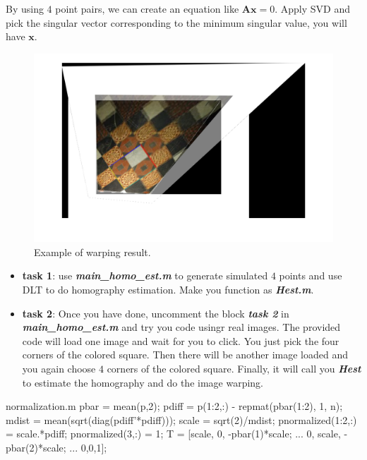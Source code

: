 \documentclass[a4paper]{article}
\begin{document}
By using $4$ point pairs, we can create an equation like $\mathbf{Ax}=0$. Apply SVD and pick the singular vector corresponding to the minimum singular value, you will have $\mathbf{x}$.

\begin{figure}[!b]
	\centering
	\includegraphics[scale=0.4]{figures/hest.png}
	\caption{Example of warping result.}
\end{figure}
\begin{itemize}
\item \textbf{task 1}: use \textbf{\textit{main\_homo\_est.m}} to generate simulated $4$ points and use DLT to do homography estimation. Make you function as \textbf{\textit{Hest.m}}.
\item \textbf{task 2}: Once you have done, uncomment the block \textbf{\textit{task 2}} in \textbf{\textit{main\_homo\_est.m}} and try you code usingr real images. The provided code will load one image and wait for you to click. You just pick the four corners of the colored square. Then there will be another image loaded and you again choose $4$ corners of the colored square. Finally, it will call you \textbf{\textit{Hest}} to estimate the homography and do the image warping.
\end{itemize}



\begin{filecontents*}{normalization.m}
	pbar = mean(p,2);%
	pdiff = p(1:2,:) - repmat(pbar(1:2), 1, n);
	mdist = mean(sqrt(diag(pdiff'*pdiff)));
	scale = sqrt(2)/mdist;
	pnormalized(1:2,:) = scale.*pdiff;
	pnormalized(3,:) = 1;
	T = [scale, 0, -pbar(1)*scale; ...
	0, scale, -pbar(2)*scale; ...
	0,0,1];
\end{filecontents*}
\end{document}
